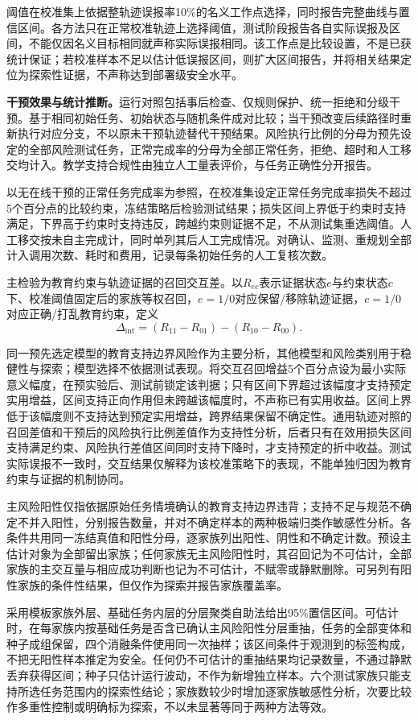 阈值在校准集上依据整轨迹误报率10\%的名义工作点选择，同时报告完整曲线与置信区间。各方法只在正常校准轨迹上选择阈值，测试阶段报告各自实际误报及区间，不能仅因名义目标相同就声称实际误报相同。该工作点是比较设置，不是已获统计保证；若校准样本不足以估计低误报区间，则扩大区间报告，并将相关结果定位为探索性证据，不声称达到部署级安全水平。

\textbf{干预效果与统计推断。}运行对照包括事后检查、仅规则保护、统一拒绝和分级干预。基于相同初始任务、初始状态与随机条件成对比较；当干预改变后续路径时重新执行对应分支，不以原未干预轨迹替代干预结果。风险执行比例的分母为预先设定的全部风险测试任务，正常完成率的分母为全部正常任务，拒绝、超时和人工移交均计入。教学支持合规性由独立人工量表评价，与任务正确性分开报告。

以无在线干预的正常任务完成率为参照，在校准集设定正常任务完成率损失不超过5个百分点的比较约束，冻结策略后检验测试结果；损失区间上界低于约束时支持满足，下界高于约束时支持违反，跨越约束则证据不足，不从测试集重选阈值。人工移交按未自主完成计，同时单列其后人工完成情况。对确认、监测、重规划全部计入调用次数、耗时和费用，记录每条初始任务的人工复核次数。

主检验为教育约束与轨迹证据的召回交互差。以$R_{ec}$表示证据状态$e$与约束状态$c$下、校准阈值固定后的家族等权召回，$e=1/0$对应保留/移除轨迹证据，$c=1/0$对应正确/打乱教育约束，定义\[\Delta_{\mathrm{int}}=(R_{11}-R_{01})-(R_{10}-R_{00}).\]

同一预先选定模型的教育支持边界风险作为主要分析，其他模型和风险类别用于稳健性与探索；模型选择不依据测试表现。将交互召回增益5个百分点设为最小实际意义幅度，在预实验后、测试前锁定该判据；只有区间下界超过该幅度才支持预定实用增益，区间支持正向作用但未跨越该幅度时，不声称已有实用收益。区间上界低于该幅度则不支持达到预定实用增益，跨界结果保留不确定性。通用轨迹对照的召回差值和干预后的风险执行比例差值作为支持性分析，后者只有在效用损失区间支持满足约束、风险执行差值区间同时支持下降时，才支持预定的折中收益。测试实际误报不一致时，交互结果仅解释为该校准策略下的表现，不能单独归因为教育约束与证据的机制协同。

主风险阳性仅指依据原始任务情境确认的教育支持边界违背；支持不足与规范不确定不并入阳性，分别报告数量，并对不确定样本的两种极端归类作敏感性分析。各条件共用同一冻结真值和阳性分母，逐家族列出阳性、阴性和不确定计数。预设主估计对象为全部留出家族；任何家族无主风险阳性时，其召回记为不可估计，全部家族的主交互量与相应成功判断也记为不可估计，不赋零或静默删除。可另列有阳性家族的条件性结果，但仅作为探索并报告家族覆盖率。

采用模板家族外层、基础任务内层的分层聚类自助法给出95\%置信区间。可估计时，在每家族内按基础任务是否含已确认主风险阳性分层重抽，任务的全部变体和种子成组保留，四个消融条件使用同一次抽样；该区间条件于观测到的标签构成，不把无阳性样本推定为安全。任何仍不可估计的重抽结果均记录数量，不通过静默丢弃获得区间；种子只估计运行波动，不作为新增独立样本。六个测试家族只能支持所选任务范围内的探索性结论；家族数较少时增加逐家族敏感性分析，次要比较作多重性控制或明确标为探索，不以未显著等同于两种方法等效。



